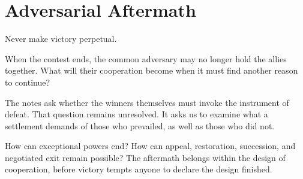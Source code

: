\chapter{Adversarial Aftermath}
\label{short:adversarial-aftermath}

Never make victory perpetual.

When the contest ends, the common adversary may no longer hold the allies
together. What will their cooperation become when it must find another
reason to continue?

The notes ask whether the winners themselves must invoke the instrument of
defeat. That question remains unresolved. It asks us to examine what a
settlement demands of those who prevailed, as well as those who did not.

How can exceptional powers end? How can appeal, restoration, succession,
and negotiated exit remain possible? The aftermath belongs within the
design of cooperation, before victory tempts anyone to declare the design
finished.

